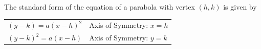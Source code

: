 \documentclass[11pt,a4paper]{book}
\begin{document}
\bigskip{}

\begin{tcolorbox}[colback=blue!5, colframe=black,boxrule=.4pt, sharpish corners]

The standard form of the equation of a parabola with vertex $\left(h,k\right)$
is given by
\begin{center}
\begin{tabular}{>{\raggedright}p{4cm}>{\raggedright}p{5cm}}
$\left(y-k\right)=a\left(x-h\right)^{2}$ & Axis of Symmetry: $x=h$

\medskip{}\tabularnewline
$\left(y-k\right)^{2}=a\left(x-h\right)$ & Axis of Symmetry: $y=k$

\medskip{}\tabularnewline
\end{tabular}
\par\end{center}

\end{tcolorbox}

\newpage
\end{document}
